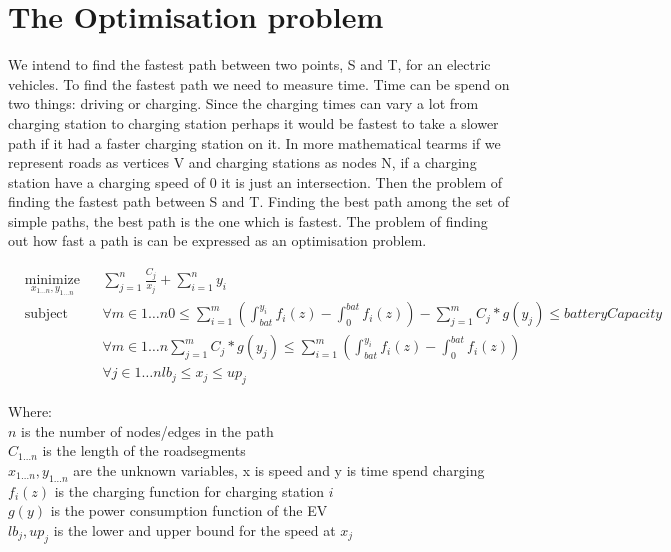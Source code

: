 \section{The Optimisation problem}

We intend to find the fastest path between two points, S and T, for an electric vehicles. To find the fastest path we need to measure time. Time can be spend on two things: driving or charging. Since the charging times can vary a lot from charging station to charging station perhaps it would be fastest to take a slower path if it had a faster charging station on it. In more mathematical tearms if we represent roads as vertices V and charging stations as nodes N, if a charging station have a charging speed of 0 it is just an intersection. Then the problem of finding the fastest path between S and T. Finding the best path among the set of simple paths, the best path is the one which is fastest. The problem of finding out how fast a path is can be expressed as an optimisation problem. 

\begin{equation}
\begin{aligned}
& \underset{x_{1 \dots n},y_{1 \dots n}}{\text{minimize}}
& & \sum_{j=1}^{n} \frac{C_j}{x_j} + \sum_{i=1}^{n} y_i \\
& \text{subject to} 
& & \forall{m \in 1 \dots n} 0 \leq \sum_{i=1}^{m} \left( \int_{bat}^{y_i} f_i(z) - \int_{0}^{bat} f_i(z)\right) - \sum_{j=1}^{m} C_j*g(y_j) \leq batteryCapacity \\
&&& \forall{m \in 1 \dots n} \sum_{j=1}^{m} C_j*g(y_j) \leq \sum_{i=1}^{m} \left( \int_{bat}^{y_i} f_i(z) - \int_{0}^{bat} f_i(z)\right) \\
&&& \forall{j \in 1 \dots n} lb_j \leq x_j \leq up_j
\end{aligned}
\end{equation}

Where: \\
$n$ is the number of nodes/edges in the path \\
$C_{1 \dots n}$ is the length of the roadsegments \\
$x_{1 \dots n}, y_{1 \dots n}$ are the unknown variables, x is speed and y is time spend charging \\
$f_{i}(z)$ is the charging function for charging station $i$ \\
$g(y)$ is the power consumption function of the EV \\
$lb_j, up_j$ is the lower and upper bound for the speed at $x_j$  \\


